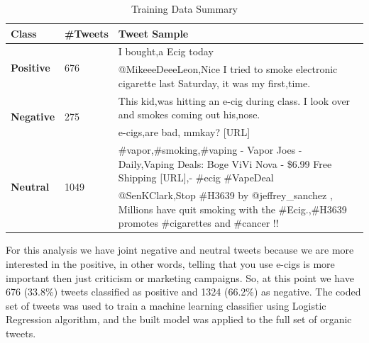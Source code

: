 \documentclass{sig-alternate}
\begin{document}
\begin{table}[t]
\centering
\caption{Training Data Summary}
\label{tab:labelsample}
\begin{tabular}{|l|l|p{9cm}|}
\hline
{\bf Class}                     & {\bf \#Tweets}        & {\bf Tweet Sample}                                                                                                                       \\ \hline
\multirow{2}{*}{{\bf Positive}} & \multirow{2}{*}{676}  & I bought,a Ecig today                                                                                                                    \\ \cline{3-3} 
                                &                       & @MikeeeDeeeLeon,Nice I tried to smoke electronic cigarette last Saturday, it was my first,time.                                          \\ \hline
\multirow{2}{*}{{\bf Negative}} & \multirow{2}{*}{275}  & This kid,was hitting an e-cig during class. I look over and smokes coming out his,nose.                                                  \\ \cline{3-3} 
                                &                       & e-cigs,are bad, mmkay? {[}URL{]}                                                                                                         \\ \hline
\multirow{2}{*}{{\bf Neutral}}  & \multirow{2}{*}{1049} & \#vapor,\#smoking,\#vaping - Vapor Joes - Daily,Vaping Deals: Boge ViVi Nova - \$6.99 Free Shipping {[}URL{]},- \#ecig \#VapeDeal        \\ \cline{3-3} 
                                &                       & @SenKClark,Stop \#H3639 by @jeffrey\_sanchez , Millions have quit smoking with the \#Ecig.,\#H3639 promotes \#cigarettes and \#cancer !! \\ \hline
\end{tabular}
\end{table}

 
For this analysis we have joint negative and neutral tweets because we are more interested in the positive, in other words, telling that you use e-cigs is more important then just criticism or marketing campaigns. So, at this point we have 676 (33.8\%) tweets classified as positive and 1324 (66.2\%) as negative. The coded set of tweets was used to train a machine learning classifier using Logistic Regression algorithm, and the built model was applied to the full set of organic tweets.
\end{document}
